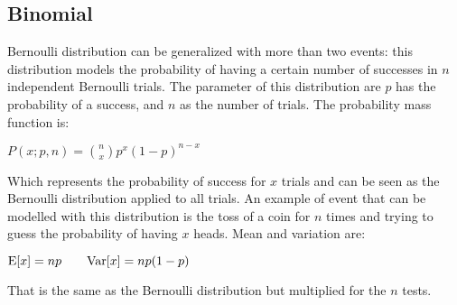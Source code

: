 \subsection{Binomial}
Bernoulli distribution can be generalized with more than two events: this distribution models the probability of having a certain number of successes in $n$ independent Bernoulli trials.\newline
The parameter of this distribution are $p$ has the probability of a success, and $n$ as the number of trials.\newline
The probability mass function is:
\begin{center}
	$\displaystyle P(x;p,n)=\binom{n}{x}p^x(1-p)^{n-x}$
\end{center}
Which represents the probability of success for $x$ trials and can be seen as the Bernoulli distribution applied to all trials.\newline
An example of event that can be modelled with this distribution is the toss of a coin for $n$ times and trying to guess the probability of having $x$ heads.\newline
Mean and variation are:
\begin{center}
	$\displaystyle \text{E}[x]=np\qquad \text{Var}[x]=np(1-p)$
\end{center}
That is the same as the Bernoulli distribution but multiplied for the $n$ tests.
%
%
